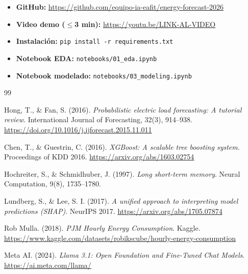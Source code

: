 \documentclass[10pt,twocolumn]{article}
\begin{document}
\begin{itemize}[leftmargin=*,topsep=2pt,itemsep=1pt]
  \item \textbf{GitHub:} \url{https://github.com/equipo-ia-eafit/energy-forecast-2026}
  \item \textbf{Video demo ($\leq$3 min):} \url{https://youtu.be/LINK-AL-VIDEO}
  \item \textbf{Instalación:} \texttt{pip install -r requirements.txt}
  \item \textbf{Notebook EDA:} \texttt{notebooks/01\_eda.ipynb}
  \item \textbf{Notebook modelado:} \texttt{notebooks/03\_modeling.ipynb}
\end{itemize}

\begin{thebibliography}{99}

Hong, T., \& Fan, S. (2016).
\textit{Probabilistic electric load forecasting: A tutorial review}.
International Journal of Forecasting, 32(3), 914--938.
\url{https://doi.org/10.1016/j.ijforecast.2015.11.011}

Chen, T., \& Guestrin, C. (2016).
\textit{XGBoost: A scalable tree boosting system}.
Proceedings of KDD 2016.
\url{https://arxiv.org/abs/1603.02754}

Hochreiter, S., \& Schmidhuber, J. (1997).
\textit{Long short-term memory}.
Neural Computation, 9(8), 1735--1780.

Lundberg, S., \& Lee, S. I. (2017).
\textit{A unified approach to interpreting model predictions (SHAP)}.
NeurIPS 2017.
\url{https://arxiv.org/abs/1705.07874}

Rob Mulla. (2018).
\textit{PJM Hourly Energy Consumption}.
Kaggle.
\url{https://www.kaggle.com/datasets/robikscube/hourly-energy-consumption}

Meta AI. (2024).
\textit{Llama 3.1: Open Foundation and Fine-Tuned Chat Models}.
\url{https://ai.meta.com/llama/}

\end{thebibliography}

\appendix
\end{document}
